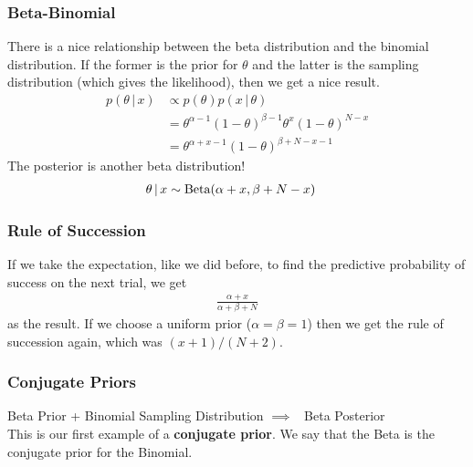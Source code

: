 \documentclass{beamer}
\newcommand{\given}{\,|\,}
\begin{document}
\begin{frame}
\frametitle{Beta-Binomial}
There is a nice relationship between the beta distribution and the binomial
distribution. If the former is the prior for $\theta$ and the latter is the
sampling distribution (which gives the likelihood), then we get a nice
result.\pause
\begin{align}
p(\theta \given x) &\propto p(\theta) p(x \given \theta) \\
    &= \theta^{\alpha-1}(1-\theta)^{\beta-1} \theta^x(1-\theta)^{N-x} \\
    &= \theta^{\alpha+x-1}(1-\theta)^{\beta+N-x-1}
\end{align}
\pause
The posterior is another beta distribution!
\begin{align}
\theta \given x &\sim \textnormal{Beta}(\alpha+x, \beta+N-x)
\end{align}

\end{frame}

\begin{frame}
\frametitle{Rule of Succession}
If we take the expectation, like we did before, to find the predictive
probability of success on the next trial, we get
\begin{align}
\frac{\alpha+x}{\alpha + \beta + N}
\end{align}
as the result. If we choose a uniform prior ($\alpha=\beta=1$)
then we get the rule of succession again, which was
$(x+1)/(N+2)$.

\end{frame}



\begin{frame}
\frametitle{Conjugate Priors}
Beta Prior + Binomial Sampling Distribution $\implies$~
Beta Posterior \\

This is our first example of a {\bf conjugate prior}.
We say that the Beta is the conjugate prior for the Binomial.

\end{frame}
\end{document}
